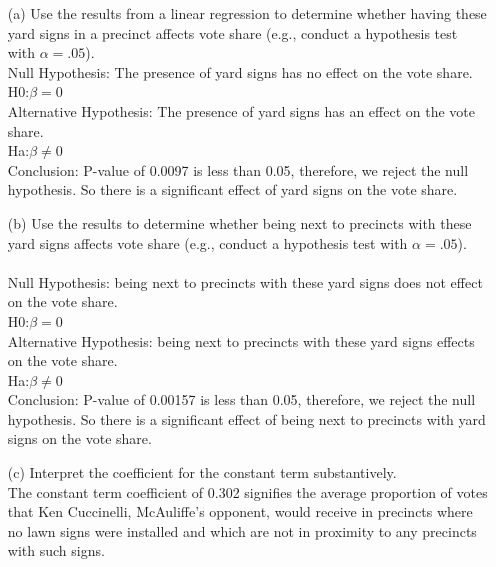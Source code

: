 \documentclass[12pt,letterpaper]{article}
\begin{document}
\vspace{.5cm}
\begin{enumerate}
	\item [(a)] Use the results from a linear regression to determine whether having these yard signs in a precinct affects vote share (e.g., conduct a hypothesis test with $\alpha = .05$).
		\\
		Null Hypothesis: The presence of yard signs has no effect on the vote share.\\
		                     H0:$\beta = 0$\\
		Alternative Hypothesis: The presence of yard signs has an effect on the vote share.\\
				             Ha:$\beta \neq 0$
				             \vspace{0.5cm}
	 \\Conclusion: P-value of 0.0097 is less than 0.05, therefore, we reject the null hypothesis. So there is a significant effect of yard signs on the vote share.
	\item [(b)]  Use the results to determine whether being
	next to precincts with these yard signs affects vote
	share (e.g., conduct a hypothesis test with $\alpha = .05$).\\
	\\
		Null Hypothesis: being next to precincts with these yard signs does not effect on the vote share.\\
	H0:$\beta = 0$\\
	Alternative Hypothesis: being next to precincts with these yard signs effects on the vote share.\\
	Ha:$\beta \neq 0$
	\vspace{0.5cm}
	\\Conclusion: P-value of 0.00157 is less than 0.05, therefore, we reject the null hypothesis. So there is a significant effect of being next to precincts with yard signs on the vote share.
	\vspace{1cm}
	\item [(c)] Interpret the coefficient for the constant term substantively.\\
	The constant term coefficient of 0.302 signifies the average proportion of votes that Ken Cuccinelli, McAuliffe's opponent, would receive in precincts where no lawn signs were installed and which are not in proximity to any precincts with such signs.\\
	

\end{enumerate}
\end{document}
